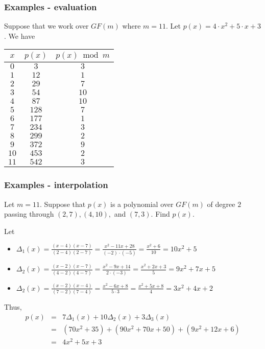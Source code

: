 \begin{frame}
  \frametitle{Examples - evaluation}

  Suppose that we work over $GF(m)$ where $m=11$.  Let $p(x) = 4\cdot
  x^2 + 5\cdot x + 3$.  We have

  {\small
  \begin{tabular}{c|c|c}
    $x$ & $p(x)$ & $p(x)\bmod m$ \\
    \hline
    $0$ & $3$ & $3$ \\
    $1$ & $12$ & $1$ \\
    $2$ & $29$ & $7$ \\
    $3$ & $54$ & $10$ \\
    $4$ & $87$ & $10$ \\
    $5$ & $128$ & $7$ \\
    $6$ & $177$ & $1$ \\
    $7$ & $234$ & $3$ \\
    $8$ & $299$ & $2$ \\
    $9$ & $372$ & $9$ \\
    $10$ & $453$ & $2$ \\
    $11$ & $542$ & $3$ \\
  \end{tabular}
  }
\end{frame}

\begin{frame}
  \frametitle{Examples - interpolation}

  Let $m=11$. Suppose that $p(x)$ is a polynomial over $GF(m)$ of
  degree $2$ passing through $(2,7),(4,10),$ and $(7,3)$.  Find $p(x)$.

  \pause
  Let
  \begin{itemize}
  \item \pause
    $\Delta_1(x)=\frac{(x-4)(x-7)}{(2-4)(2-7)}
    =\frac{x^2-11x+28}{(-2)\cdot(-5)}
    =\frac{x^2+6}{10}
    =10x^2+5$
  \item \pause
    $\Delta_2(x)=\frac{(x-2)(x-7)}{(4-2)(4-7)}
    =\frac{x^2-9x+14}{2\cdot(-3)}
    =\frac{x^2+2x+3}{5}
    =9x^2+7x+5$
  \item \pause
    $\Delta_2(x)=\frac{(x-2)(x-4)}{(7-2)(7-4)}
    =\frac{x^2-6x+8}{5\cdot 3}
    =\frac{x^2+5x+8}{4}
    =3x^2+4x+2$
  \end{itemize}

  Thus,
  \begin{eqnarray*}
    p(x) &=&  7\Delta_1(x) + 10\Delta_2(x) + 3\Delta_3(x) \\
    &=& (70x^2 + 35) + (90x^2 + 70x+50) + (9x^2+12x+6) \\
    &=& 4x^2+5x+3
  \end{eqnarray*}
\end{frame}


